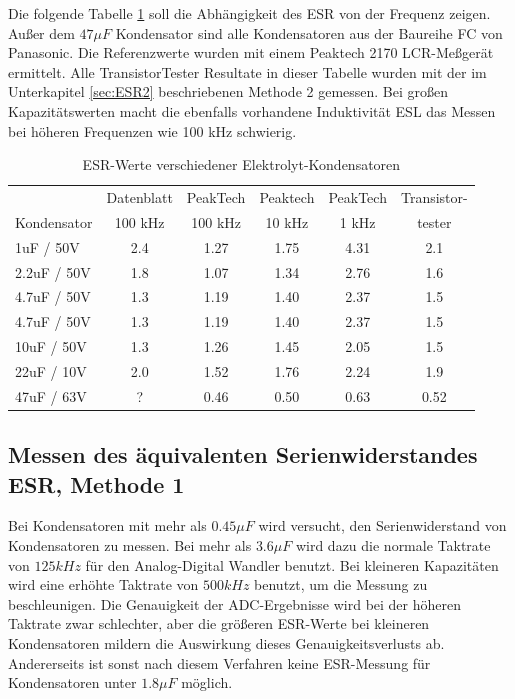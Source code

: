 Die folgende Tabelle \ref{tab:capESR} soll die Abhängigkeit des ESR von der Frequenz zeigen.
Außer dem \(47 \mu F\) Kondensator sind alle Kondensatoren aus der Baureihe FC von Panasonic.
Die Referenzwerte wurden mit einem Peaktech 2170 LCR-Meßgerät ermittelt.
Alle TransistorTester Resultate in dieser Tabelle wurden mit der im Unterkapitel \ref{sec:ESR2} 
beschriebenen Methode 2 gemessen.
Bei großen Kapazitätswerten macht die ebenfalls vorhandene Induktivität ESL das Messen bei höheren Frequenzen 
wie 100 kHz schwierig.


\begin{table}[H]
  \begin{center}
    \begin{tabular}{| l | c | c | c | c | c |}
   \hline
            & Datenblatt & PeakTech  & Peaktech & PeakTech & Transistor- \\
Kondensator & 100 kHz    & 100 kHz   & 10 kHz   & 1 kHz    & tester  \\
    \hline
    \hline
1uF / 50V    & 2.4       & 1.27      & 1.75     & 4.31     &  2.1 \\
    \hline
2.2uF / 50V  & 1.8       & 1.07      & 1.34     & 2.76     &  1.6 \\
    \hline
4.7uF / 50V  & 1.3       & 1.19      & 1.40     & 2.37     &  1.5 \\
    \hline
4.7uF / 50V  & 1.3       & 1.19      & 1.40     & 2.37     &  1.5 \\
    \hline
10uF / 50V   & 1.3       & 1.26      & 1.45     & 2.05     &  1.5 \\
    \hline
22uF / 10V   & 2.0       & 1.52      & 1.76     & 2.24     &  1.9 \\
    \hline
47uF / 63V   & ?         & 0.46      & 0.50     & 0.63     &  0.52 \\
    \hline
    \end{tabular}
  \end{center}
  \caption{ESR-Werte verschiedener Elektrolyt-Kondensatoren}
  \label{tab:capESR} 
\end{table}


\subsection{Messen des äquivalenten Serienwiderstandes ESR, Methode 1}
Bei Kondensatoren mit mehr als \(0.45 \mu F\) wird versucht, den Serienwiderstand von Kondensatoren zu messen.
Bei mehr als \(3.6 \mu F\) wird dazu die normale Taktrate von \(125 kHz\) für den Analog-Digital Wandler benutzt.
Bei kleineren Kapazitäten wird eine erhöhte Taktrate von \(500 kHz\) benutzt, um die Messung zu beschleunigen.
Die Genauigkeit der ADC-Ergebnisse wird bei der höheren Taktrate zwar schlechter, aber die größeren ESR-Werte
bei kleineren Kondensatoren mildern die Auswirkung dieses Genauigkeitsverlusts ab. 
Andererseits ist sonst nach diesem Verfahren keine ESR-Messung für Kondensatoren unter \(1.8 \mu F\) möglich.

